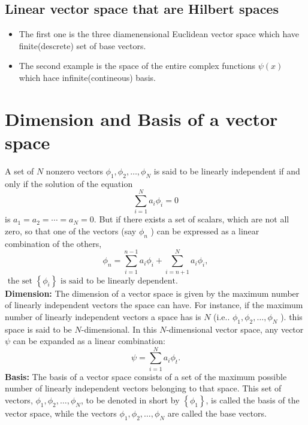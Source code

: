 \subsection{Linear vector space that are Hilbert spaces}
\begin{itemize}
	\item The first one is the three diamenensional Euclidean vector space which have finite(descrete) set of base vectors.
	\item The second example is the space of the entire complex functions $\psi(x)$ which hace infinite(contineous) basis.
\end{itemize}
\section{Dimension and Basis of a vector space}
A set of $N$ nonzero vectors $\phi_{1}, \phi_{2}, \ldots, \phi_{N}$ is said to be linearly independent if and only if the solution of the equation
$$
\sum_{i=1}^{N} a_{i} \phi_{i}=0
$$
is $a_{1}=a_{2}=\cdots=a_{N}=0 .$ But if there exists a set of scalars, which are not all zero, so that one of the vectors (say $\phi_{n}$ ) can be expressed as a linear combination of the others,
$$
\phi_{n}=\sum_{i=1}^{n-1} a_{i} \phi_{i}+\sum_{i=n+1}^{N} a_{i} \phi_{i},
$$
$\text { the set }\left\{\phi_{i}\right\} \text { is said to be linearly dependent. }$\\
\textbf{Dimension:} The dimension of a vector space is given by the maximum number of linearly independent vectors the space can have. For instance, if the maximum number of linearly independent vectors a space has is $N$ (i.e.. $\phi_{1}, \phi_{2}, \ldots, \phi_{N}$ ). this space is said to be $N$-dimensional. In this $N$-dimensional vector space, any vector $\psi$ can be expanded as a linear combination:
$$
\psi=\sum_{i=1}^{N} a_{i} \phi_{t} .
$$
\textbf{Basis:} The basis of a vector space consists of a set of the maximum possible number of linearly independent vectors belonging to that space. This set of vectors, $\phi_{1}, \phi_{2}, \ldots, \phi_{N}$, to be denoted in short by $\left\{\phi_{1}\right\}$, is called the basis of the vector space, while the vectors $\phi_{1}, \phi_{2}, \ldots, \phi_{N}$ are called the base vectors.
